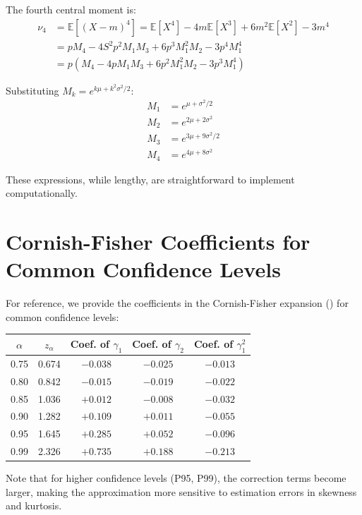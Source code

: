 \documentclass[12pt,a4paper]{article}
\theoremstyle{definition}
\theoremstyle{remark}
\newcommand{\E}{\mathbb{E}}
\begin{document}
The fourth central moment is:
\begin{align}
    \nu_4 &= \E[(X - m)^4] = \E[X^4] - 4m\E[X^3] + 6m^2\E[X^2] - 3m^4 \\
    &= p M_4 - 4 S^2 p^2 M_1 M_3 + 6 p^3 M_1^2 M_2 - 3 p^4 M_1^4 \\
    &= p \left( M_4 - 4 p M_1 M_3 + 6 p^2 M_1^2 M_2 - 3 p^3 M_1^4 \right)
\end{align}

Substituting $M_k = e^{k\mu + k^2\sigma^2/2}$:
\begin{align}
    M_1 &= e^{\mu + \sigma^2/2} \\
    M_2 &= e^{2\mu + 2\sigma^2} \\
    M_3 &= e^{3\mu + 9\sigma^2/2} \\
    M_4 &= e^{4\mu + 8\sigma^2}
\end{align}

These expressions, while lengthy, are straightforward to implement computationally.

\section{Cornish-Fisher Coefficients for Common Confidence Levels}
\label{app:cf_coefficients}

For reference, we provide the coefficients in the Cornish-Fisher expansion () for common confidence levels:

\begin{center}
\begin{tabular}{ccccc}
\toprule
$\alpha$ & $z_\alpha$ & Coef. of $\gamma_1$ & Coef. of $\gamma_2$ & Coef. of $\gamma_1^2$ \\
\midrule
0.75 & 0.674 & $-0.038$ & $-0.025$ & $-0.013$ \\
0.80 & 0.842 & $-0.015$ & $-0.019$ & $-0.022$ \\
0.85 & 1.036 & $+0.012$ & $-0.008$ & $-0.032$ \\
0.90 & 1.282 & $+0.109$ & $+0.011$ & $-0.055$ \\
0.95 & 1.645 & $+0.285$ & $+0.052$ & $-0.096$ \\
0.99 & 2.326 & $+0.735$ & $+0.188$ & $-0.213$ \\
\bottomrule
\end{tabular}
\end{center}

Note that for higher confidence levels (P95, P99), the correction terms become larger, making the approximation more sensitive to estimation errors in skewness and kurtosis.
\end{document}
